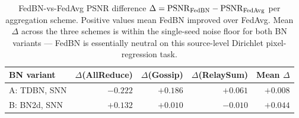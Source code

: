 %

\begin{table}[t]
\centering
\caption{FedBN-vs-FedAvg PSNR difference $\Delta = \mathrm{PSNR}_{\rm FedBN}
- \mathrm{PSNR}_{\rm FedAvg}$ per aggregation scheme. Positive values mean
FedBN improved over FedAvg. Mean $\Delta$ across the three schemes is
within the single-seed noise floor for both BN variants — FedBN is
essentially neutral on this source-level Dirichlet pixel-regression task.}
\label{tab:fedbn_ablation}
\renewcommand{\arraystretch}{1.10}
\setlength{\tabcolsep}{6pt}
\begin{tabular}{l r r r r}
\toprule
BN variant & $\Delta$(AllReduce) & $\Delta$(Gossip) & $\Delta$(RelaySum) & Mean $\Delta$ \\
\midrule
A: TDBN, SNN & $-0.222$ & $+0.186$ & $+0.061$ & $\mathbf{+0.008}$ \\
B: BN2d, SNN & $+0.132$ & $+0.010$ & $-0.010$ & $\mathbf{+0.044}$ \\
\bottomrule
\end{tabular}
\end{table}
